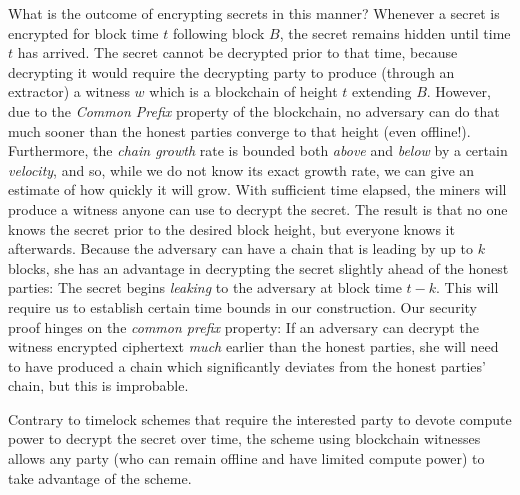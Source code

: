 What is the outcome of encrypting secrets in this manner? Whenever a secret is encrypted
for block time $t$ following block $B$, the secret remains hidden until time $t$ has arrived.
The secret cannot be decrypted prior to that time, because decrypting it would require the decrypting party
to produce (through an extractor) a witness $w$ which is a blockchain of height $t$ extending $B$. However,
due to the \emph{Common Prefix} property of the blockchain, no adversary can do that much sooner than the
honest parties converge to that height (even offline!).
Furthermore, the \emph{chain growth} rate is bounded both \emph{above} 
and \emph{below} by a certain \emph{velocity}, and so, while we do not know its exact growth rate, we can give
an estimate of how quickly it will grow.
With sufficient time elapsed, the miners will produce a witness anyone can use to decrypt the
secret. The result is that no one knows the secret prior to the desired block height, but everyone
knows it afterwards. Because the adversary can have a chain that is leading by up to $k$ blocks, she has
an advantage in decrypting the secret slightly ahead of the honest parties: The
secret begins \emph{leaking} to the adversary at block time $t - k$. This will require us to establish
certain time bounds in our construction.
Our security proof hinges on the \emph{common prefix} property: If
an adversary can decrypt the witness encrypted ciphertext \emph{much} earlier than the honest parties,
she will need to have produced a chain which significantly deviates from the honest parties' chain,
but this is improbable.

Contrary to timelock schemes that require the interested party to devote compute power to decrypt the secret
over time, the scheme using blockchain witnesses allows any party (who can remain offline and have limited compute
power) to take advantage of the scheme.
